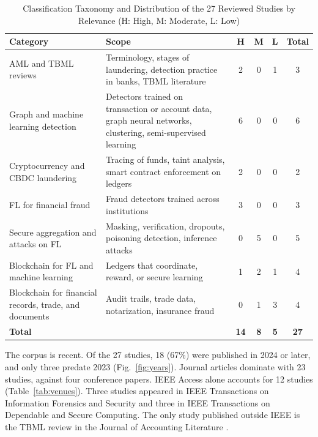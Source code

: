\documentclass[journal]{IEEEtran}
\begin{document}
\begin{table}[!t]
\centering
\caption{Classification Taxonomy and Distribution of the 27 Reviewed Studies by Relevance (H: High, M: Moderate, L: Low)}
\label{tab:taxonomy}
\footnotesize
\begin{tabularx}{\textwidth}{@{}L{4.6cm}Ycccc@{}}
\toprule
\textbf{Category} & \textbf{Scope} & \textbf{H} & \textbf{M} & \textbf{L} & \textbf{Total}\\
\midrule
AML and TBML reviews & Terminology, stages of laundering, detection practice in banks, TBML literature & 2 & 0 & 1 & 3\\
Graph and machine learning detection & Detectors trained on transaction or account data, graph neural networks, clustering, semi-supervised learning & 6 & 0 & 0 & 6\\
Cryptocurrency and CBDC laundering & Tracing of funds, taint analysis, smart contract enforcement on ledgers & 2 & 0 & 0 & 2\\
FL for financial fraud & Fraud detectors trained across institutions & 3 & 0 & 0 & 3\\
Secure aggregation and attacks on FL & Masking, verification, dropouts, poisoning detection, inference attacks & 0 & 5 & 0 & 5\\
Blockchain for FL and machine learning & Ledgers that coordinate, reward, or secure learning & 1 & 2 & 1 & 4\\
Blockchain for financial records, trade, and documents & Audit trails, trade data, notarization, insurance fraud & 0 & 1 & 3 & 4\\
\midrule
\textbf{Total} & & \textbf{14} & \textbf{8} & \textbf{5} & \textbf{27}\\
\bottomrule
\end{tabularx}
\end{table}

The corpus is recent. Of the 27 studies, 18 (67\%) were published in 2024 or later, and only three predate 2023 (Fig.~\ref{fig:years}). Journal articles dominate with 23 studies, against four conference papers. IEEE Access alone accounts for 12 studies (Table~\ref{tab:venues}). Three studies appeared in IEEE Transactions on Information Forensics and Security and three in IEEE Transactions on Dependable and Secure Computing. The only study published outside IEEE is the TBML review in the Journal of Accounting Literature \cite{tiwari2025tbml}.
\end{document}

